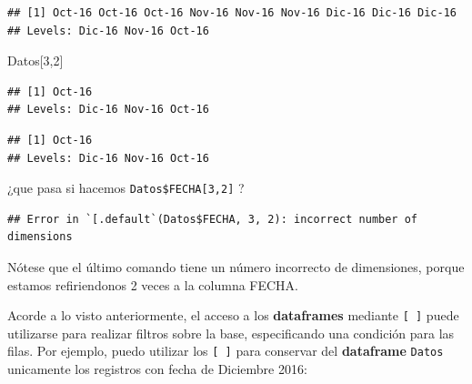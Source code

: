 \documentclass[]{book}
\newenvironment{Shaded}{\begin{snugshade}}{\end{snugshade}}
\newcommand{\DecValTok}[1]{\textcolor[rgb]{0.00,0.00,0.81}{#1}}
\newcommand{\NormalTok}[1]{#1}
\newcommand{\OperatorTok}[1]{\textcolor[rgb]{0.81,0.36,0.00}{\textbf{#1}}}
\begin{document}
\begin{Shaded}
\end{Shaded}

\begin{verbatim}
## [1] Oct-16 Oct-16 Oct-16 Nov-16 Nov-16 Nov-16 Dic-16 Dic-16 Dic-16
## Levels: Dic-16 Nov-16 Oct-16
\end{verbatim}

\begin{Shaded}
\begin{Highlighting}[]
\NormalTok{Datos[}\DecValTok{3}\NormalTok{,}\DecValTok{2}\NormalTok{]}
\end{Highlighting}
\end{Shaded}

\begin{verbatim}
## [1] Oct-16
## Levels: Dic-16 Nov-16 Oct-16
\end{verbatim}

\begin{Shaded}
\end{Shaded}

\begin{verbatim}
## [1] Oct-16
## Levels: Dic-16 Nov-16 Oct-16
\end{verbatim}

¿que pasa si hacemos \texttt{Datos\$FECHA{[}3,2{]}} ?

\begin{Shaded}
\end{Shaded}

\begin{verbatim}
## Error in `[.default`(Datos$FECHA, 3, 2): incorrect number of dimensions
\end{verbatim}

Nótese que el último comando tiene un número incorrecto de dimensiones, porque estamos refiriendonos 2 veces a la columna FECHA.

Acorde a lo visto anteriormente, el acceso a los \textbf{dataframes} mediante \texttt{{[}\ {]}} puede utilizarse para realizar filtros sobre la base, especificando una condición para las filas. Por ejemplo, puedo utilizar los \texttt{{[}\ {]}} para conservar del \textbf{dataframe} \texttt{Datos} unicamente los registros con fecha de Diciembre 2016:
\end{document}
